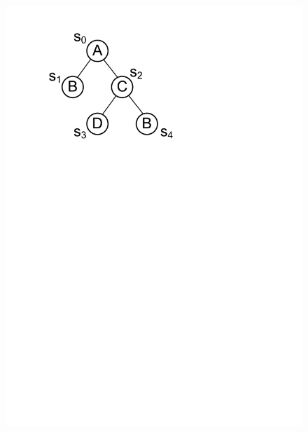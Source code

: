 \begin{figure}[t!]
{		\includegraphics[scale=0.33]{images/tree_structure3}
		\label{fig:tree_structure3}
	}
\end{figure}
